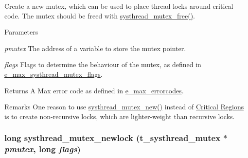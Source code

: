 Create a new mutex, which can be used to place thread locks around critical code. The mutex should be freed with \hyperlink{group__mutex_ga5fdfbb20bfe5b9e6b223436758ea88b1}{systhread\_\-mutex\_\-free()}.


\begin{DoxyParams}{Parameters}
\item[{\em pmutex}]The address of a variable to store the mutex pointer. \item[{\em flags}]Flags to determine the behaviour of the mutex, as defined in \hyperlink{group__threading_gaa95d9c538a1b25404d19106739db9802}{e\_\-max\_\-systhread\_\-mutex\_\-flags}. \end{DoxyParams}
\begin{DoxyReturn}{Returns}
A Max error code as defined in \hyperlink{group__misc_ga0764dd6c02b76cca7d053ae50555d69d}{e\_\-max\_\-errorcodes}.
\end{DoxyReturn}
\begin{DoxyRemark}{Remarks}
One reason to use \hyperlink{group__mutex_gaa8cae78764c59883566ac4f861dd534e}{systhread\_\-mutex\_\-new()} instead of \hyperlink{group__critical}{Critical Regions} is to create non-\/recursive locks, which are lighter-\/weight than recursive locks. 
\end{DoxyRemark}
\hypertarget{group__mutex_ga57c63515a67e9739aa0f916ae05e8a18}{
\subsubsection[{systhread\_\-mutex\_\-newlock}]{\setlength{\rightskip}{0pt plus 5cm}long systhread\_\-mutex\_\-newlock ({\bf t\_\-systhread\_\-mutex} $\ast$ {\em pmutex}, \/  long {\em flags})}}
\label{group__mutex_ga57c63515a67e9739aa0f916ae05e8a18}


